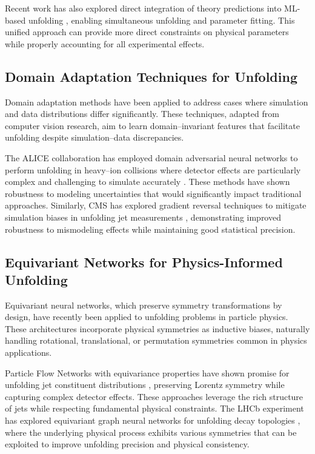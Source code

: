     Recent work has also explored direct integration of theory predictions into ML-based unfolding , enabling simultaneous unfolding and parameter fitting.
    This unified approach can provide more direct constraints on physical parameters while properly accounting for all experimental effects.

\subsection{Domain Adaptation Techniques for Unfolding}
    Domain adaptation methods have been applied to address cases where simulation and data distributions differ significantly.
    These techniques, adapted from computer vision research, aim to learn domain--invariant features that facilitate unfolding despite simulation--data discrepancies.

    The ALICE collaboration has employed domain adversarial neural networks to perform unfolding in heavy--ion collisions where detector effects are particularly complex and challenging to simulate accurately .
    These methods have shown robustness to modeling uncertainties that would significantly impact traditional approaches.
    Similarly, CMS has explored gradient reversal techniques to mitigate simulation biases in unfolding jet measurements , demonstrating improved robustness to mismodeling effects while maintaining good statistical precision.

\subsection{Equivariant Networks for Physics-Informed Unfolding}
    Equivariant neural networks, which preserve symmetry transformations by design, have recently been applied to unfolding problems in particle physics.
    These architectures incorporate physical symmetries as inductive biases, naturally handling rotational, translational, or permutation symmetries common in physics applications.

    Particle Flow Networks with equivariance properties have shown promise for unfolding jet constituent distributions , preserving Lorentz symmetry while capturing complex detector effects. 
    These approaches leverage the rich structure of jets while respecting fundamental physical constraints.
    The LHCb experiment has explored equivariant graph neural networks for unfolding decay topologies , where the underlying physical process exhibits various symmetries that can be exploited to improve unfolding precision and physical consistency.

